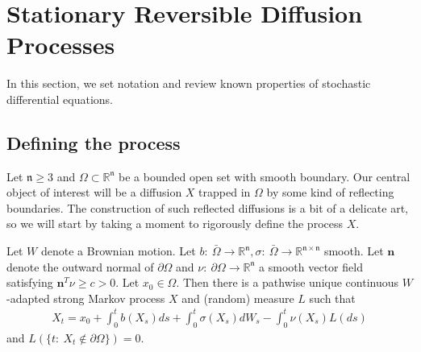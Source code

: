 \documentclass[english, aip, jcp, priprint, graphicx,floatfix]{revtex4-1}
\theoremstyle{plain}
\theoremstyle{definition}
\theoremstyle{plain}
\newcommand{\dimension}{{\mathfrak{n}}}
\begin{document}
\section{Stationary Reversible Diffusion Processes}\label{sec:reversible_diffusion}

In this section, we set notation and review known properties of stochastic differential equations.   

\subsection{Defining the process}

Let $\dimension \geq 3$ and $\Omega \subset \mathbb{R}^\dimension$ be a bounded open set with smooth boundary.  Our central object of interest will be a diffusion $X$ trapped in $\Omega$ by some kind of reflecting boundaries.  The construction of such reflected diffusions is a bit of a delicate art, so we will start by taking a moment to rigorously define the process $X$.

Let $W$ denote a Brownian motion.  Let $b:\ \bar \Omega \rightarrow \mathbb{R}^\dimension,\sigma:\ \bar \Omega \rightarrow \mathbb{R}^{\dimension\times\dimension}$ smooth.  Let $\mathbf{n}$ denote the outward normal of $\partial \Omega$ and $\nu:\ \partial \Omega \rightarrow \mathbb{R}^\dimension$ a smooth vector field satisfying $\mathbf{n}^T\nu\geq c>0$. Let $x_0 \in \Omega$.  Then there is a pathwise unique continuous $W$-adapted strong Markov process $X$ and (random) measure $L$ such that 
\begin{gather}\label{eq:SDER}
X_t = x_0 + \int_0^t b(X_s)ds + \int_0^t \sigma(X_s)dW_s - \int_0^t \nu(X_s) L(ds)
\end{gather}
and $L(\{t:\ X_t \notin \partial \Omega\})=0$.\cite{lions1984stochastic} 
\end{document}
